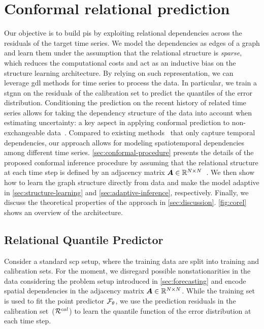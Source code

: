 \section{Conformal relational prediction}\label{sec:method}

Our objective is to build \glspl{pi} by exploiting relational dependencies across the residuals of the target time series. We model the dependencies as edges of a graph and learn them under the assumption that the relational structure is \textit{sparse}, which reduces the computational costs and act as an inductive bias on the structure learning architecture. By relying on such representation, we can leverage \gls{gdl} methods for time series to process the data. In particular, we train a \gls{stgnn} on the residuals of the calibration set to predict the quantiles of the error distribution. Conditioning the prediction on the recent history of related time series allows for taking the dependency structure of the data into account when estimating uncertainty: a key aspect in applying conformal prediction to non-exchangeable data~\citep{barber2023conformal}. Compared to existing methods~\cite{xu2023sequential, auer2023conformal} that only capture temporal dependencies, our approach allows for modeling spatiotemporal dependencies among different time series. 
\autoref{sec:conformal-procedure} presents the details of the proposed conformal inference procedure by assuming that the relational structure at each time step is defined by an adjacency matrix ${\bm{A}} \in {\mathbb{R}}^{N\times N}$~. We then show how to learn the graph structure directly from data and make the model adaptive in \autoref{sec:structure-learning} and \autoref{sec:adaptive-inference}, respectively. Finally, we discuss the theoretical properties of the approach in \autoref{sec:discussion}. \autoref{fig:corel} shows an overview of the architecture.

\subsection{Relational Quantile Predictor}\label{sec:conformal-procedure}

Consider a standard \gls{scp} setup, where the training data are split into training and calibration sets. For the moment, we disregard possible nonstationarities in the data considering the problem setup introduced in \autoref{sec:forecasting} and encode spatial dependencies in the adjacency matrix ${\bm{A}} \in {\mathbb{R}}^{N\times N}$. While the training set is used to fit the point predictor ${\mathcal{F}}_\theta$, we use the prediction residuals in the calibration set~(${\mathcal{R}}^{cal}$) to learn the quantile function of the error distribution at each time step. 

